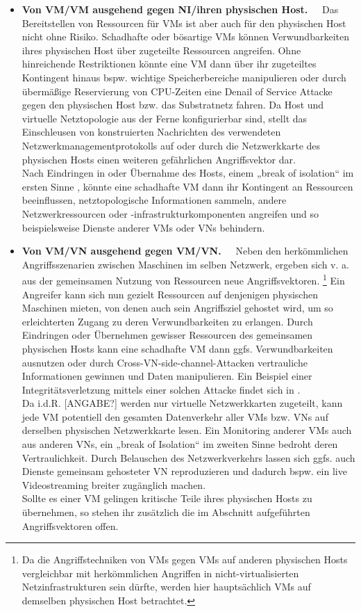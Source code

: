\begin{itemize}
\item \textbf{Von VM/VM ausgehend gegen NI/ihren physischen Host.~~}
Das Bereitstellen von Ressourcen für VMs ist aber auch für den physischen Host nicht ohne Risiko. Schadhafte oder bösartige VMs können Verwundbarkeiten ihres physischen Host über zugeteilte Ressourcen angreifen. Ohne hinreichende Restriktionen könnte eine VM dann über ihr zugeteiltes Kontingent hinaus bspw. wichtige Speicherbereiche manipulieren oder durch übermäßige Reservierung von CPU-Zeiten eine Denail of Service Attacke gegen den physischen Host bzw. das Substratnetz fahren. Da Host und virtuelle Netztopologie aus der Ferne konfigurierbar sind, stellt das Einschleusen von konstruierten Nachrichten des verwendeten Netzwerkmanagementprotokolls auf oder durch die Netzwerkkarte des physischen Hosts einen weiteren gefährlichen Angriffsvektor dar.\\
Nach Eindringen in oder Übernahme des Hosts, einem „break of isolation“ im ersten Sinne \cite{wu2010network}, könnte eine schadhafte VM dann ihr Kontingent an Ressourcen beeinflussen, netztopologische Informationen sammeln, andere Netzwerkressourcen oder -infrastrukturkomponenten angreifen und so beispielsweise Dienste anderer VMs oder VNs behindern.

\item \textbf{Von VM/VN ausgehend gegen VM/VN.~~}
Neben den herkömmlichen Angriffsszenarien zwischen Maschinen im selben Netzwerk, ergeben sich v. a. aus der gemeinsamen Nutzung von Ressourcen neue Angriffsvektoren. 
\footnote{Da die Angriffstechniken von VMs gegen VMs auf anderen physischen Hosts vergleichbar mit herkömmlichen Angriffen in nicht-virtualisierten Netzinfrastrukturen sein dürfte, werden hier hauptsächlich VMs auf demselben physischen Host betrachtet.} 
Ein Angreifer kann sich nun gezielt Ressourcen auf denjenigen physischen Maschinen mieten, von denen auch sein Angriffsziel gehostet wird, um so erleichterten Zugang zu deren Verwundbarkeiten zu erlangen. Durch Eindringen oder Übernehmen gewisser Ressourcen des gemeinsamen physischen Hosts kann eine schadhafte VM dann ggfs. Verwundbarkeiten ausnutzen oder durch Cross-VN-side-channel-Attacken vertrauliche Informationen gewinnen und Daten manipulieren. Ein Beispiel einer Integritätsverletzung mittels einer solchen Attacke findet sich in \cite{ristenpart2009hey}. \\
Da i.d.R. [ANGABE?] werden nur virtuelle Netzwerkkarten zugeteilt, kann jede VM potentiell den gesamten Datenverkehr aller VMs bzw. VNs auf derselben physischen Netzwerkkarte lesen. Ein Monitoring anderer VMs auch aus anderen VNs, ein „break of Isolation“ im zweiten Sinne bedroht deren Vertraulichkeit. Durch Belauschen des Netzwerkverkehrs lassen sich ggfs. auch Dienste gemeinsam gehosteter VN reproduzieren und dadurch bspw. ein live Videostreaming breiter zugänglich machen.\cite{natarajansecurity}\\
Sollte es einer VM gelingen kritische Teile ihres physischen Hosts zu übernehmen, so stehen ihr zusätzlich die im Abschnitt \textit{} aufgeführten Angriffsvektoren offen.



\end{itemize}
